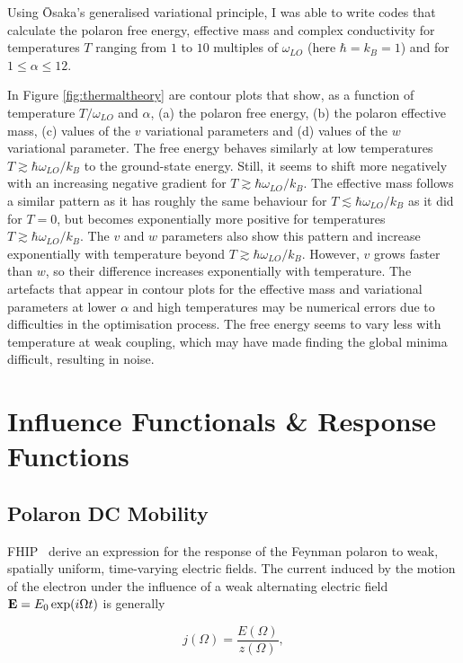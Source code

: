 Using \=Osaka's generalised variational principle, I was able to write codes that calculate the polaron free energy, effective mass and complex conductivity for temperatures $T$ ranging from $1$ to $10$ multiples of $\omega_{LO}$ (here $\hbar = k_B = 1$) and for $1\leq\alpha\leq12$. 

In Figure \ref{fig:thermaltheory} are contour plots that show, as a function of temperature $T / \omega_{LO}$ and $\alpha$, (a) the polaron free energy, (b) the polaron effective mass, (c) values of the $v$ variational parameters and (d) values of the $w$ variational parameter. The free energy behaves similarly at low temperatures $T \gtrsim \hbar \omega_{LO} / k_B$ to the ground-state energy. Still, it seems to shift more negatively with an increasing negative gradient for $T \gtrsim \hbar \omega_{LO} / k_B$. The effective mass follows a similar pattern as it has roughly the same behaviour for $T \lesssim \hbar \omega_{LO} / k_B$ as it did for $T = 0$, but becomes exponentially more positive for temperatures $T \gtrsim \hbar \omega_{LO} / k_B$. The $v$ and $w$ parameters also show this pattern and increase exponentially with temperature beyond $T \gtrsim \hbar \omega_{LO} / k_B$. However, $v$ grows faster than $w$, so their difference increases exponentially with temperature. The artefacts that appear in contour plots for the effective mass and variational parameters at lower $\alpha$ and high temperatures may be numerical errors due to difficulties in the optimisation process. The free energy seems to vary less with temperature at weak coupling, which may have made finding the global minima difficult, resulting in noise. 

\section{Influence Functionals \& Response Functions}
\label{sec:2-3}

\subsection{Polaron DC Mobility}
\label{subsec:2-3-1}

FHIP~\cite{feynman_mobility_1962} derive an expression for the response of the Feynman polaron to weak, spatially uniform, time-varying electric fields. The current induced by the motion of the electron under the influence of a weak  alternating electric field $\vb{E} = E_0 \exp(i \Omega t)$ is generally

\begin{equation}
    j(\Omega) = \frac{E(\Omega)}{z(\Omega)} ,
\end{equation}

